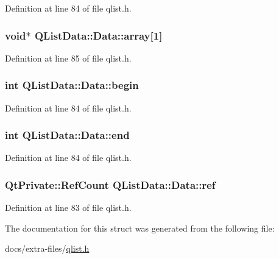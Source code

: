 Definition at line 84 of file qlist.\+h.

\subsubsection[{\texorpdfstring{array}{array}}]{\setlength{\rightskip}{0pt plus 5cm}void$\ast$ Q\+List\+Data\+::\+Data\+::array\mbox{[}1\mbox{]}}\hypertarget{struct_q_list_data_1_1_data_af5c124359e9bc2e895ac22f115920de4}{}\label{struct_q_list_data_1_1_data_af5c124359e9bc2e895ac22f115920de4}


Definition at line 85 of file qlist.\+h.

\subsubsection[{\texorpdfstring{begin}{begin}}]{\setlength{\rightskip}{0pt plus 5cm}int Q\+List\+Data\+::\+Data\+::begin}\hypertarget{struct_q_list_data_1_1_data_a72b722ed04d2ba8e83dbf67f27d3c743}{}\label{struct_q_list_data_1_1_data_a72b722ed04d2ba8e83dbf67f27d3c743}


Definition at line 84 of file qlist.\+h.

\subsubsection[{\texorpdfstring{end}{end}}]{\setlength{\rightskip}{0pt plus 5cm}int Q\+List\+Data\+::\+Data\+::end}\hypertarget{struct_q_list_data_1_1_data_a9e472fb47499e6a368429e85441aad94}{}\label{struct_q_list_data_1_1_data_a9e472fb47499e6a368429e85441aad94}


Definition at line 84 of file qlist.\+h.

\subsubsection[{\texorpdfstring{ref}{ref}}]{\setlength{\rightskip}{0pt plus 5cm}Qt\+Private\+::\+Ref\+Count Q\+List\+Data\+::\+Data\+::ref}\hypertarget{struct_q_list_data_1_1_data_ae8b0e0ecd9cf79d6b787c328096f2ff9}{}\label{struct_q_list_data_1_1_data_ae8b0e0ecd9cf79d6b787c328096f2ff9}


Definition at line 83 of file qlist.\+h.



The documentation for this struct was generated from the following file\+:\begin{DoxyCompactItemize}
\item 
docs/extra-\/files/\hyperlink{qlist_8h}{qlist.\+h}\end{DoxyCompactItemize}
